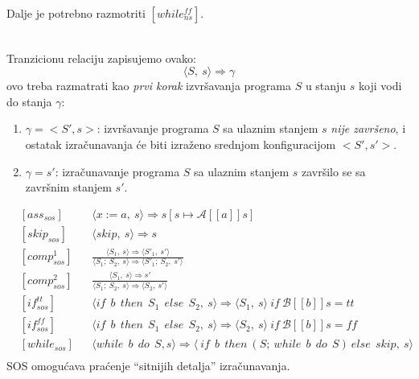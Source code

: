 \documentclass[../main.tex]{subfiles}
\begin{document}
Dalje je potrebno razmotriti $[while_{ns}^{ff}]$.
\begin{boxprimer}
\\
Tranzicionu relaciju zapisujemo ovako:
\[ \big \langle S,\ s \big \rangle \Longrightarrow \gamma \]
ovo treba razmatrati kao {\it prvi korak} izvršavanja programa $S$ u stanju $s$ koji vodi do stanja $\gamma$: 
\begin{enumerate}
\item $\gamma = < S', s >$: izvršavanje programa $S$ sa ulaznim stanjem $s$ {\it nije završeno}, i ostatak izračunavanja će biti izraženo srednjom konfiguracijom $< S', s' >$.
\item $\gamma = s'$: izračunavanje programa $S$ sa ulaznim stanjem $s$ završilo se sa završnim stanjem $s'$.
\end{enumerate}
\begin{align*}
&[ass_{sos}] &&\big \langle x := a,\ s\big \rangle  \Rightarrow s[s\mapsto \mathcal{A}[[a]]s] \\
&[skip_{sos}] &&  
	\big \langle skip,\ s\big \rangle  \Rightarrow s \\
&[comp_{sos}^{1}] &&\frac{ \big \langle S_1,\ s\big \rangle \Rightarrow \big \langle {S'}_1,\ s'\big \rangle}
	{ \big \langle S_1;\ S_2,\ s\big \rangle \Rightarrow \big \langle {S'}_1;\ S_2,\ s' \big \rangle}\\
&[comp_{sos}^{2}] && 
	\frac{ \big \langle S_1,\ s\big \rangle \Rightarrow s'}
	{ \big \langle S_1;\ S_2,\ s\big \rangle \Rightarrow \big \langle S_2,\ s' \big \rangle}\\
&[if_{sos}^{tt}] &&\big \langle if\ \ b\ \ then\ \ S_1\ \ else\ \ S_2,\ s\big \rangle 
	\Rightarrow\big \langle S_1,\ s\big \rangle \ if \ \mathcal{B}[[b]]s=tt \\
&[if_{sos}^{ff}] &&\big \langle if\ \ b\ \ then\ \ S_1\ \ else\ \ S_2,\ s\big \rangle 
	\Rightarrow\big \langle S_2,\ s\big \rangle \ if \ \mathcal{B}[[b]]s=ff \\
&[while_{sos}] &&\big \langle while\ \ b\ \ do\ \ S, s \big \rangle \Rightarrow
	\big \langle \ if\ \ b\ \ then\ (S;\ while\ \ b\ \ do\ \ S)\ else\ \ skip,\ s \big \rangle \\
\end{align*}
SOS omogućava praćenje ``sitnijih detalja'' izračunavanja.
\end{boxprimer}
\end{document}
